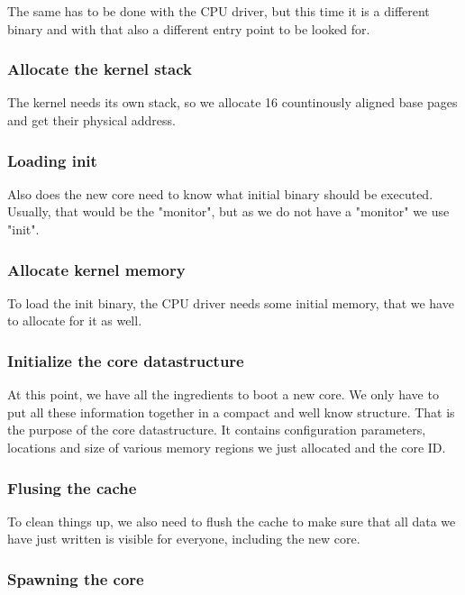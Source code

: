 The same has to be done with the CPU driver, but this time it is a different binary and with that also a different entry point to be looked for.

\subsubsection{Allocate the kernel stack}

The kernel needs its own stack, so we allocate 16 countinously aligned base pages and get their physical address.

\subsubsection{Loading init}

Also does the new core need to know what initial binary should be executed. Usually, that would be the "monitor", but as we do not have a "monitor" we use "init".

\subsubsection{Allocate kernel memory}

To load the init binary, the CPU driver needs some initial memory, that we have to allocate for it as well.

\subsubsection{Initialize the core datastructure}

At this point, we have all the ingredients to boot a new core. We only have to put all these information together in a compact and well know structure. That is the purpose of the core datastructure. It contains configuration parameters, locations and size of various memory regions we just allocated and the core ID.

\subsubsection{Flusing the cache}

To clean things up, we also need to flush the cache to make sure that all data we have just written is visible for everyone, including the new core.

\subsubsection{Spawning the core}

